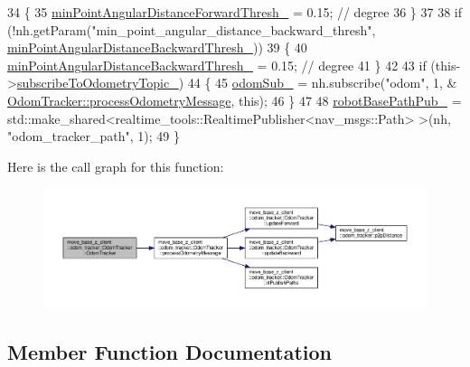 \begin{DoxyCode}
34     \{
35         \hyperlink{classmove__base__z__client_1_1odom__tracker_1_1OdomTracker_a8675c1d9bd1713d46a467d4aa1aa29a2}{minPointAngularDistanceForwardThresh\_} = 0.15; \textcolor{comment}{// degree}
36     \}
37 
38     \textcolor{keywordflow}{if} (!nh.getParam(\textcolor{stringliteral}{"min\_point\_angular\_distance\_backward\_thresh"}, 
      \hyperlink{classmove__base__z__client_1_1odom__tracker_1_1OdomTracker_ad50ecd0f634a3b9d2f68a54788b8c96a}{minPointAngularDistanceBackwardThresh\_}))
39     \{
40         \hyperlink{classmove__base__z__client_1_1odom__tracker_1_1OdomTracker_ad50ecd0f634a3b9d2f68a54788b8c96a}{minPointAngularDistanceBackwardThresh\_} = 0.15; \textcolor{comment}{// degree}
41     \}
42 
43     \textcolor{keywordflow}{if} (this->\hyperlink{classmove__base__z__client_1_1odom__tracker_1_1OdomTracker_af07071223326ba38fc95037717102bb4}{subscribeToOdometryTopic\_})
44     \{
45         \hyperlink{classmove__base__z__client_1_1odom__tracker_1_1OdomTracker_a6a6b1dcb9f0cfae01007ca949b562ee2}{odomSub\_} = nh.subscribe(\textcolor{stringliteral}{"odom"}, 1, &
      \hyperlink{classmove__base__z__client_1_1odom__tracker_1_1OdomTracker_a79b9f1e3b15fa6ac82dd93ab78e23579}{OdomTracker::processOdometryMessage}, \textcolor{keyword}{this});
46     \}
47 
48     \hyperlink{classmove__base__z__client_1_1odom__tracker_1_1OdomTracker_a3eb6ca9be9504dc3c1da949d1e1daeda}{robotBasePathPub\_} = std::make\_shared<realtime\_tools::RealtimePublisher<nav\_msgs::Path>
      >(nh, \textcolor{stringliteral}{"odom\_tracker\_path"}, 1);
49 \}
\end{DoxyCode}


Here is the call graph for this function\+:\nopagebreak
\begin{figure}[H]
\begin{center}
\leavevmode
\includegraphics[width=350pt]{classmove__base__z__client_1_1odom__tracker_1_1OdomTracker_ab6d1b57e311a9434a95c112e2f62501f_cgraph}
\end{center}
\end{figure}




\subsection{Member Function Documentation}
